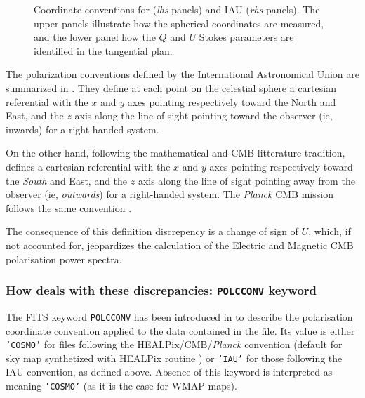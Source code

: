 \documentclass[12pt,twoside]{article}
\begin{document}
\begin{figure}[!ht]
\caption[Coordinate conventions]%
{\label{fig:reftqu}%
Coordinate conventions for \healpix ({\em lhs} panels) and IAU ({\em rhs} panels). The
  upper panels illustrate how the spherical coordinates are measured, and the
  lower panel how the $Q$ and $U$ Stokes parameters are identified in the
  tangential plan.
}
\end{figure}

The polarization conventions defined by the International Astronomical Union
\citep{iau74} are summarized in \cite{hambreg}. They define at each point on the
celestial sphere a cartesian referential with the $x$ and $y$ axes pointing
respectively toward the North and East, and the $z$
axis along the line of sight pointing toward the observer (ie, inwards) for a
right-handed system.

On the other hand, following the mathematical and CMB litterature tradition,
\healpix defines a cartesian referential with the $x$ and $y$ axes pointing
respectively toward the {\em South} and East, and the $z$ axis along the line of sight
pointing away from the observer (ie, {\em outwards}) for a right-handed
system. The {\em Planck} CMB mission follows the same convention \citep{ansari}.

The consequence of this definition discrepency is a change of sign of $U$,
which, if not accounted for, jeopardizes the calculation of the Electric and Magnetic  CMB
polarisation power spectra.

\subsubsection{How \healpix deals with these discrepancies: \texttt{POLCCONV} keyword}
\label{intro:polcconv}
The FITS keyword \texttt{POLCCONV} has been introduced in  to describe the
polarisation coordinate convention applied to the data contained in the file. 
Its value is either \texttt{'COSMO'} for files following the HEALPix/CMB/{\em Planck} convention 
(default for sky map synthetized with HEALPix routine )
or \texttt{'IAU'} for those
following the IAU convention, as defined above. Absence of this keyword is
interpreted as meaning \texttt{'COSMO'} (as it is the case for WMAP maps).
\end{document}
